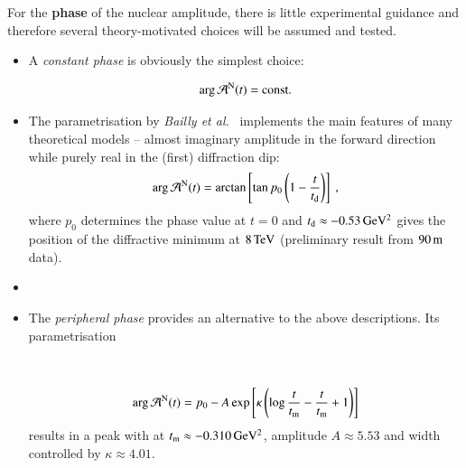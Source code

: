 For the {\bf phase} of the nuclear amplitude, there is little experimental guidance and therefore several theory-motivated choices will be assumed and tested.

\begin{itemize}

\item A {\it constant phase} is obviously the simplest choice:

\begin{equation}
\label{eq:nuc phase const}
\arg {\cal A}^{\rm N}(t) = \hbox{const.}
\end{equation}

\item The parametrisation by {\em Bailly et al.}~\cite{bailly87} implements the main features of many theoretical models -- almost imaginary amplitude in the forward direction while purely real in the (first) diffraction dip:
\begin{equation}
\label{eq:nuc phase std}
	\arg {\cal A}^{\rm N}(t) = \arctan \left[ \tan p_0 \left(1 - {t\over t_{\rm d}} \right) \right]\ ,
\end{equation}
where $p_0$ determines the phase value at $t=0$ and $t_{\rm d} \approx -0.53\,{\rm GeV^2}$ gives the position of the diffractive minimum at $8\,{\rm TeV}$ (preliminary result from $90\,{\rm m}$ data).

\item {}

\item The {\it peripheral phase} \cite{kl94}  provides an alternative to the above descriptions. Its parametrisation

\\

\begin{equation}
\label{eq:nuc phase per}
\arg {\cal A}^{\rm N}(t) = p_0 - A \exp\left[ \kappa \left( \log {t\over t_{\rm m}} - {t\over t_{\rm m}} + 1 \right) \right]
\end{equation}
results in a peak with at $t_{\rm m} \approx -0.310\,{\rm GeV^2}$, amplitude $A \approx 5.53$ and width controlled by $\kappa \approx 4.01$.

\end{itemize}

